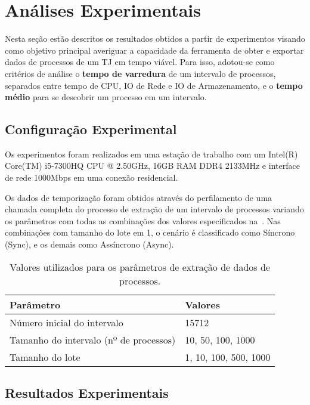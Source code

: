 \chapter{Análises Experimentais~\label{chp:Resultados-Experimentais}}

Nesta seção estão descritos os resultados obtidos a partir de experimentos
visando como objetivo principal averiguar a capacidade da ferramenta de obter e
exportar dados de processos de um TJ em tempo viável. Para isso, adotou-se como
critérios de análise o \textbf{tempo de varredura} de um intervalo de
processos, separados entre tempo de CPU, IO de Rede e IO de Armazenamento, e o
\textbf{tempo médio} para se descobrir um processo em um intervalo.

\section{Configuração Experimental~\label{sec:Configuração-Experimental}}

Os experimentos foram realizados em uma estação de trabalho com um Intel(R)
Core(TM) i5-7300HQ CPU @ 2.50GHz, 16GB RAM DDR4 2133MHz e interface de rede
1000Mbps em uma conexão residencial.

Os dados de temporização foram obtidos através do perfilamento de uma chamada
completa do processo de extração de um intervalo de processos variando os
parâmetros com todas as combinações dos valores especificados
na~. Nas combinações com tamanho do lote
em 1, o cenário é classificado como Síncrono (Sync), e os demais como
Assíncrono (Async).

\begin{table}[htb]
  \centering
  \begin{tabular}{ll}
    \toprule
    Parâmetro & Valores \\
    \midrule
    Número inicial do intervalo & 15712 \\
    Tamanho do intervalo (nº de processos) & 10, 50, 100, 1000 \\
    Tamanho do lote & 1, 10, 100, 500, 1000 \\
    \bottomrule
  \end{tabular}
  \caption{%
    Valores utilizados para os parâmetros de extração de dados de processos.
  }
  \label{tbl:parâmetros-de-perfilamento}
\end{table}

\section{Resultados Experimentais}



